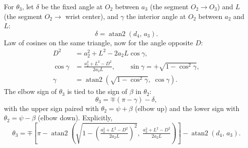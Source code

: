 \documentclass[11pt]{article}
\newcommand{\atantwo}{\operatorname{atan2}}
\begin{document}
For $\theta_3$, let $\delta$ be the fixed angle at $O_2$ between $a_3$ (the segment $O_2\to O_3$) and $L$ (the segment $O_2\to$ wrist center), and $\gamma$ the interior angle at $O_2$ between $a_2$ and $L$:
\begin{equation}
\delta = \atantwo\!\left(d_4,\,a_3\right).
\end{equation}
Law of cosines on the same triangle, now for the angle opposite $D$:
\begin{align}
D^2 &= a_2^2 + L^2 - 2a_2L\cos\gamma, \\
\cos\gamma &= \frac{a_2^2+L^2-D^2}{2a_2L}, \qquad
\sin\gamma = +\sqrt{1-\cos^2\gamma}, \\
\gamma &= \atantwo\!\left(\sqrt{1-\cos^2\gamma},\;\cos\gamma\right).
\end{align}
The elbow sign of $\theta_3$ is tied to the sign of $\beta$ in $\theta_2$:
\begin{equation}
\theta_3 = \mp(\pi-\gamma) - \delta ,
\end{equation}
with the upper sign paired with $\theta_2=\psi+\beta$ (elbow up) and the lower sign with $\theta_2=\psi-\beta$ (elbow down). Explicitly,
\begin{equation}
\theta_3 = \mp\left[\pi - \atantwo\!\left(\sqrt{1-\left(\tfrac{a_2^2+L^2-D^2}{2a_2L}\right)^{2}},\; \tfrac{a_2^2+L^2-D^2}{2a_2L}\right)\right] - \atantwo\!\left(d_4,\,a_3\right).
\end{equation}
\end{document}
